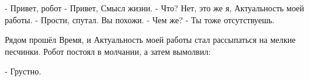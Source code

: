 - Привет, робот
- Привет, Смысл жизни.
- Что? Нет, это же я, Актуальность моей работы.
- Прости, спутал. Вы похожи.
- Чем же?
- Ты тоже отсутствуешь.

Рядом прошёл Время, и Актуальность моей работы стал рассыпаться на мелкие песчинки. Робот постоял в молчании, а затем вымолвил:

- Грустно.